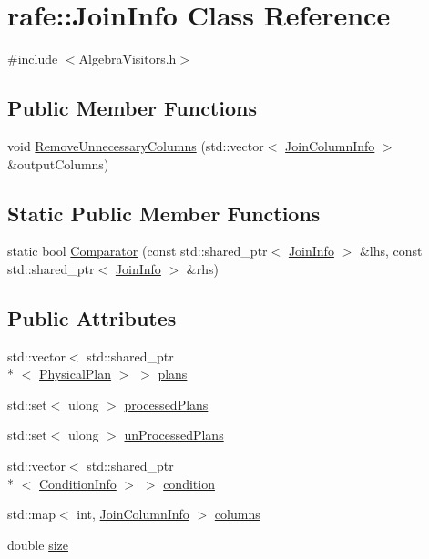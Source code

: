 \hypertarget{classrafe_1_1_join_info}{\section{rafe\+:\+:Join\+Info Class Reference}
\label{classrafe_1_1_join_info}
}


{\ttfamily \#include $<$Algebra\+Visitors.\+h$>$}

\subsection*{Public Member Functions}
\begin{DoxyCompactItemize}
\item 
void \hyperlink{classrafe_1_1_join_info_aef77063546aef0986b17dde67e89a581}{Remove\+Unnecessary\+Columns} (std\+::vector$<$ \hyperlink{classrafe_1_1_join_column_info}{Join\+Column\+Info} $>$ \&output\+Columns)
\end{DoxyCompactItemize}
\subsection*{Static Public Member Functions}
\begin{DoxyCompactItemize}
\item 
static bool \hyperlink{classrafe_1_1_join_info_aae492a171e8a72940722e35a30027e72}{Comparator} (const std\+::shared\+\_\+ptr$<$ \hyperlink{classrafe_1_1_join_info}{Join\+Info} $>$ \&lhs, const std\+::shared\+\_\+ptr$<$ \hyperlink{classrafe_1_1_join_info}{Join\+Info} $>$ \&rhs)
\end{DoxyCompactItemize}
\subsection*{Public Attributes}
\begin{DoxyCompactItemize}
\item 
std\+::vector$<$ std\+::shared\+\_\+ptr\\*
$<$ \hyperlink{classrafe_1_1_physical_plan}{Physical\+Plan} $>$ $>$ \hyperlink{classrafe_1_1_join_info_a1708cd5a22856820424f962b09066971}{plans}
\item 
std\+::set$<$ ulong $>$ \hyperlink{classrafe_1_1_join_info_aac96010c2f7c715f90e85e5ac25b31df}{processed\+Plans}
\item 
std\+::set$<$ ulong $>$ \hyperlink{classrafe_1_1_join_info_a430413badd7d9bd9c1d4bd27645ad98e}{un\+Processed\+Plans}
\item 
std\+::vector$<$ std\+::shared\+\_\+ptr\\*
$<$ \hyperlink{classrafe_1_1_condition_info}{Condition\+Info} $>$ $>$ \hyperlink{classrafe_1_1_join_info_a129f469fae807daf5195e930587050eb}{condition}
\item 
std\+::map$<$ int, \hyperlink{classrafe_1_1_join_column_info}{Join\+Column\+Info} $>$ \hyperlink{classrafe_1_1_join_info_a368a23397966ad965bf6de58d4471760}{columns}
\item 
double \hyperlink{classrafe_1_1_join_info_a3e362e7ce03809986b095b731119afc9}{size}
\end{DoxyCompactItemize}


